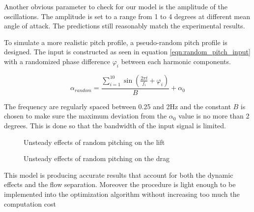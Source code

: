\FloatBarrier

\par Another obvious parameter to check for our model is the amplitude of the oscillations.
The amplitude is set to a range from 1 to 4 degrees at different mean angle of attack.
The predictions still reasonably match the experimental results. 



\par To simulate a more realistic pitch profile, a pseudo-random pitch profile is designed.
The input is constructed as seen in equation \ref{eqn:random_pitch_input} with a randomized phase difference $\varphi_i$ between each harmonic components.

\begin{equation}
	\alpha_{random}= \frac{\sum_{i=1}^{10} \sin (\frac{2 \pi t}{f_i} + \varphi_i)}{B} + \alpha_{0}
	\label{eqn:random_pitch_input}
\end{equation}

The frequency are regularly spaced between 0.25 and 2Hz and the constant $B$ is chosen to make sure the maximum deviation from the $\alpha_0$ value is no more than 2 degrees.
This is done so that the bandwidth of the input signal is limited.

\begin{figure}[h]
  \begin{center}
  \end{center}
  \caption{Unsteady effects of random pitching on the lift}
  \label{fig:Pitching_random_Cl_12}
\end{figure}

\begin{figure}[h]
  \begin{center}
  \end{center}
  \caption{Unsteady effects of random pitching on the drag}
  \label{fig:Pitching_random_Cd_12}
\end{figure}


\FloatBarrier

\par This model is producing accurate results that account for both the dynamic effects and the flow separation.
Moreover the procedure is light enough to be implemented into the optimization algorithm without increasing too much the computation cost


